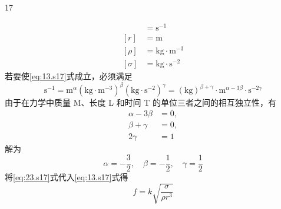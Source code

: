\begin{solution}{17}
\begin{subsolution}
\begin{subsubproblem}
            \begin{align}
                [f] &= \mathrm{s}^{-1} \label{eq:15.s17} \\
                [r] &= \mathrm{m} \label{eq:16.s17} \\
                [\rho] &= \mathrm{kg} \cdot \mathrm{m}^{-3} \label{eq:17.s17} \\
                [\sigma] &= \mathrm{kg} \cdot \mathrm{s}^{-2} \label{eq:18.s17}
            \end{align}
            若要使\eqref{eq:13.s17}式成立，必须满足
            \begin{equation}
                \mathrm{s}^{-1} = \mathrm{m}^{\alpha}(\mathrm{kg} \cdot \mathrm{m}^{-3})^{\beta}(\mathrm{kg} \cdot \mathrm{s}^{-2})^{\gamma} = (\mathrm{kg})^{\beta + \gamma} \cdot \mathrm{m}^{\alpha - 3\beta} \cdot \mathrm{s}^{-2\gamma}
                \label{eq:19.s17}
            \end{equation}
            由于在力学中质量 M、长度 L 和时间 T 的单位三者之间的相互独立性，有
            \begin{align}
                \alpha - 3\beta &= 0, \label{eq:20.s17} \\
                \beta + \gamma &= 0, \label{eq:21.s17} \\
                2\gamma &= 1 \label{eq:22.s17}
            \end{align}
            解为
            \begin{equation}
                \alpha = -\frac{3}{2}, \quad \beta = -\frac{1}{2}, \quad \gamma = \frac{1}{2}
                \label{eq:23.s17}
            \end{equation}
            将\eqref{eq:23.s17}式代入\eqref{eq:13.s17}式得
            \begin{equation}
                f = k \sqrt{\frac{\sigma}{\rho r^{3}}}
                \label{eq:24.s17}
            \end{equation}
        \end{subsubproblem}
    \end{subsolution}
\end{solution}